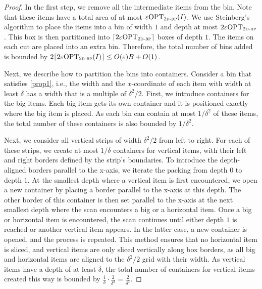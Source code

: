 \documentclass[a4paper,UKenglish,cleveref, autoref, thm-restate]{lipics-v2021}
\newcommand{\eps}{\varepsilon}
\newcommand{\opt}{\mathrm{OPT}}
\newcommand{\twobp}{\textsc{2d-bp}\xspace}
\newcommand{\inter}{intermediate\xspace}
\newcommand{\bigy}{big\xspace}
\begin{document}
\begin{proof}
In the first step, we remove all the \inter items from the bin. 
Note that these items have a total area of at most $\eps  \opt_{\twobp}(I)$.
We use Steinberg's algorithm \cite{steinberg1997strip} to place the items into a bin of width $1$ and depth at most $2\eps \opt_{\twobp}$.
This box is then partitioned into $\lceil 2\eps \opt_{\twobp} \rceil$ boxes of depth $1$. The items on each cut are placed into an extra bin. Therefore, the total number of bins added is bounded by $2\lceil 2\eps \opt_{\twobp}(I) \rceil \leq {O}(\eps)B+O(1)$. 

Next, we describe how to partition the bins into containers. 
Consider a bin that satisfies \cref{prop1}, i.e., the width and the $x$-coordinate of each item with width at least $\delta$ has a width that is a multiple of $\delta^2/2$.
First, we introduce containers for the \bigy items. 
Each \bigy item gets its own container and it is positioned exactly where the \bigy item is placed.
As each bin can contain at most $1/\delta^2$ of these items, the total number of these containers is also bounded by $1/\delta^2$.

Next, we consider all vertical strips of width $\delta^2/2$ from left to right.
For each of these strips, we create at most $1/\delta$ containers for vertical items, with their left and right borders defined by the strip’s boundaries.
To introduce the depth-aligned borders parallel to the x-axis, we iterate the packing from depth $0$ to depth $1$.
At the smallest depth where a vertical item is first encountered, we open a new container by placing a border parallel to the x-axis at this depth.
The other border of this container is then set parallel to the x-axis at the next smallest depth where the scan encounters a \bigy or a horizontal item.
Once a \bigy or horizontal item is encountered, the scan continues until either depth $1$ is reached or another vertical item appears.
In the latter case, a new container is opened, and the process is repeated.
This method ensures that no horizontal item is sliced, and vertical items are only sliced vertically along box borders, as all \bigy and horizontal items are aligned to the $\delta^2/2$ grid with their width.
As vertical items have a depth of at least $\delta$, the total number of containers for vertical items created this way is bounded by $\frac{1}{\delta} \cdot \frac{2}{\delta^2} = \frac{2}{\delta^3}$.


\end{proof}
\end{document}
